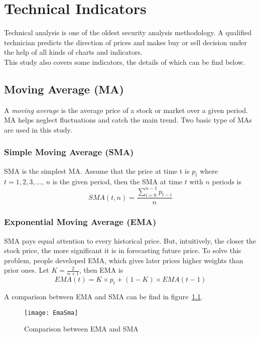 \chapter{Technical Indicators}
\label{append:technical_indicator}

Technical analysis is one of the oldest security analysis methodology. A qualified technician predicts the direction of prices and makes buy or sell decision under the help of all kinds of charts and indicators.\\


This study also covers some indicators, the details of which can be find below.


\section{Moving Average (MA)\cite{kahn2006technical}}
A \textit{moving average} is the average price of a stock or market over a given period. MA helps neglect fluctuations and catch the main trend. Two basic type of MAs are used in this study.

\subsection{Simple Moving Average (SMA)}
SMA is the simplest MA. Assume that the price at time t is $ p_t $ where $t=1,2,3,\ldots$, $n$ is the given period, then the SMA at time $ t $ with $ n $ periods is
\begin{equation}
SMA(t, n)=\frac{\sum_{i=0}^{n-1}p_{t-i}}{n}
\end{equation}

\subsection{Exponential Moving Average (EMA)}  
SMA pays equal attention to every historical price. But, intuitively, the closer the stock price, the more significant it is in forecasting future price. To solve this problem, people developed EMA, which gives later prices higher weights than prior ones. Let $ K =\frac{2}{n+1} $, then EMA is 
\begin{equation}
EMA(t) = K\times p_t+(1-K) \times EMA(t-1)
\end{equation}

A comparison between EMA and SMA can be find in figure~\ref{fg:smaema}.
\begin{figure}[h]
	\centering
	\texttt{[image: EmaSma]}
	\caption{Comparison between EMA and SMA\cite{9_sma_ema}}
	\label{fg:smaema}
\end{figure}

